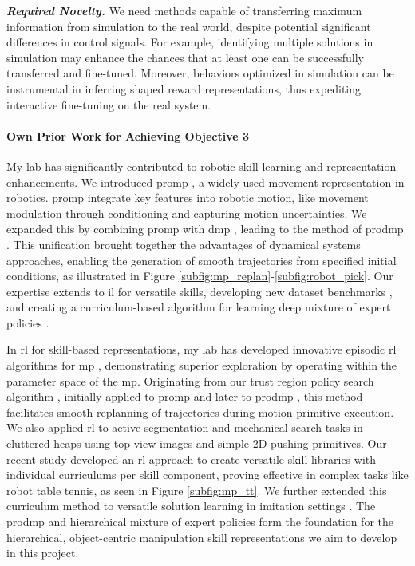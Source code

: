 \documentclass{erc-B2}
\begin{document}
\textit{\textbf{Required Novelty.}} We need methods capable of transferring maximum information from simulation to the real world, despite potential significant differences in control signals. For example, identifying multiple solutions in simulation may enhance the chances that at least one can be successfully transferred and fine-tuned. Moreover, behaviors optimized in simulation can be instrumental in inferring shaped reward representations, thus expediting interactive fine-tuning on the real system.



\paragraph{Own Prior Work for Achieving  Objective 3} My lab has significantly contributed to robotic skill learning and representation enhancements. We introduced \gls*{promp} \cite{paraschos2013probabilistic}, a widely used movement representation in robotics. \gls*{promp} integrate key features into robotic motion, like movement modulation through conditioning and capturing motion uncertainties. We expanded this by combining \gls*{promp} with \gls*{dmp} \cite{schaal2006dynamic, ijspeert2013dynamical}, leading to the method of \gls*{prodmp} \cite{li2023prodmp}. This unification brought together the advantages of dynamical systems approaches, enabling the generation of smooth trajectories from specified initial conditions, as illustrated in Figure \ref{subfig:mp_replan}-\ref{subfig:robot_pick}. Our expertise extends to \gls*{il} for versatile skills, developing new dataset benchmarks \cite{David2024}, and creating a curriculum-based algorithm for learning deep mixture of expert policies \cite{blessing2023information}.

In \gls*{rl} for skill-based representations, my lab has developed innovative episodic \gls*{rl} algorithms for \gls*{mp} \cite{otto2023deep, otto2023mp3}, demonstrating superior exploration by operating within the parameter space of the \gls*{mp}. Originating from our trust region policy search algorithm \cite{otto2021differentiable}, initially applied to \gls*{promp} and later to \gls*{prodmp} \cite{otto2023mp3}, this method facilitates smooth replanning of trajectories during motion primitive execution. We also applied \gls*{rl} to active segmentation \cite{serhan2022push} and mechanical search tasks \cite{Zenkri2022} in cluttered heaps using top-view images and simple 2D pushing primitives. Our recent study \cite{celik2022specializing} developed an \gls*{rl} approach to create versatile skill libraries with individual curriculums per skill component, proving effective in complex tasks like robot table tennis, as seen in Figure \ref{subfig:mp_tt}. We further extended this curriculum method to versatile solution learning in imitation settings \cite{blessing2023information}. The \gls*{prodmp} and hierarchical mixture of expert policies form the foundation for the hierarchical, object-centric manipulation skill representations we aim to develop in this project.
\end{document}
